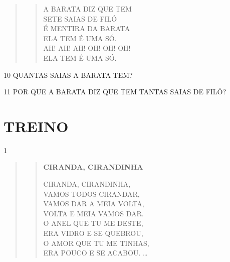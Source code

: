 \begin{quote}
\begin{verse}
A BARATA DIZ QUE TEM\\
SETE SAIAS DE FILÓ\\
É MENTIRA DA BARATA\\
ELA TEM É UMA SÓ.\\
AH! AH! AH! OH! OH! OH!\\
ELA TEM É UMA SÓ.
\end{verse}

\end{quote}

\num{10} QUANTAS SAIAS A BARATA TEM?


\num{11} POR QUE A BARATA DIZ QUE TEM TANTAS SAIAS DE FILÓ?


\section{TREINO}


\num{1}

\begin{minipage}{.8\textwidth}
\begin{quote}
\begin{verse}
\textbf{CIRANDA, CIRANDINHA}

CIRANDA, CIRANDINHA,\\
VAMOS TODOS CIRANDAR,\\
VAMOS DAR A MEIA VOLTA,\\
VOLTA E MEIA VAMOS DAR.\\
O ANEL QUE TU ME DESTE,\\
ERA VIDRO E SE QUEBROU,\\
O AMOR QUE TU ME TINHAS,\\
ERA POUCO E SE ACABOU. \ldots{}
\end{verse}%
\end{quote}
\end{minipage}
\begin{minipage}{.2\textwidth}
\end{minipage}

